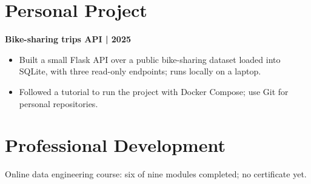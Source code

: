 \documentclass[11pt,a4paper]{article}
\newcommand{\cvsection}[1]{\section*{#1}}
\begin{document}
\cvsection{Personal Project}
\textbf{Bike-sharing trips API | 2025}
\begin{itemize}
\item Built a small Flask API over a public bike-sharing dataset loaded into SQLite, with three read-only endpoints; runs locally on a laptop.
\item Followed a tutorial to run the project with Docker Compose; use Git for personal repositories.
\end{itemize}

\cvsection{Professional Development}
Online data engineering course: six of nine modules completed; no certificate yet.
\end{document}
